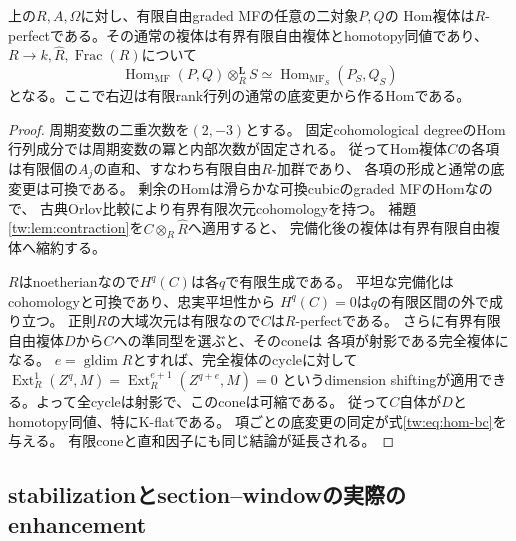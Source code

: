 \begin{lemma}\label{tw:lem:proper-hom}
上の$R,A,\Omega$に対し、有限自由graded MFの任意の二対象$P,Q$の
Hom複体は$R$-perfectである。その通常の複体は有界有限自由複体とhomotopy同値であり、
$R\to k,\widehat R,\operatorname{Frac}(R)$について
\begin{equation}\label{tw:eq:hom-bc}
 \operatorname{Hom}_{\mathrm{MF}}(P,Q)\otimes_R^{\mathbf L}S
 \simeq\operatorname{Hom}_{\mathrm{MF}_S}(P_S,Q_S)
\end{equation}
となる。ここで右辺は有限rank行列の通常の底変更から作るHomである。
\end{lemma}
\begin{proof}
周期変数の二重次数を$(2,-3)$とする。
固定cohomological degreeのHom行列成分では周期変数の冪と内部次数が固定される。
従ってHom複体$C$の各項は有限個の$A_j$の直和、すなわち有限自由$R$-加群であり、
各項の形成と通常の底変更は可換である。
剰余のHomは滑らかな可換cubicのgraded MFのHomなので、
古典Orlov比較により有界有限次元cohomologyを持つ。
補題\ref{tw:lem:contraction}を$C\otimes_R\widehat R$へ適用すると、
完備化後の複体は有界有限自由複体へ縮約する。

$R$はnoetherianなので$H^q(C)$は各$q$で有限生成である。
平坦な完備化はcohomologyと可換であり、忠実平坦性から
$H^q(C)=0$は$q$の有限区間の外で成り立つ。
正則$R$の大域次元は有限なので$C$は$R$-perfectである。
さらに有界有限自由複体$D$から$C$への準同型を選ぶと、そのconeは
各項が射影である完全複体になる。
$e=\operatorname{gldim}R$とすれば、完全複体のcycleに対して
$\operatorname{Ext}^1_R(Z^q,M)=\operatorname{Ext}^{e+1}_R(Z^{q+e},M)=0$
というdimension shiftingが適用できる。よって全cycleは射影で、このconeは可縮である。
従って$C$自体が$D$とhomotopy同値、特にK-flatである。
項ごとの底変更の同定が式\eqref{tw:eq:hom-bc}を与える。
有限coneと直和因子にも同じ結論が延長される。
\end{proof}

\subsection{stabilizationとsection--windowの実際のenhancement}

